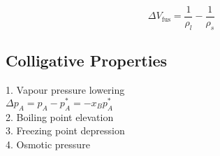 \begin{equation*}
    \Delta V_{\mathrm{fus}} = \frac{1}{\rho_l} - \frac{1}{\rho_s}
\end{equation*}

\subsection*{Colligative Properties}
1. Vapour pressure lowering \\
$\Delta p_A = p_A - p^{*}_{A} = -x_B p^*_A$ \\
2. Boiling point elevation \\
3. Freezing point depression \\
4. Osmotic pressure \\